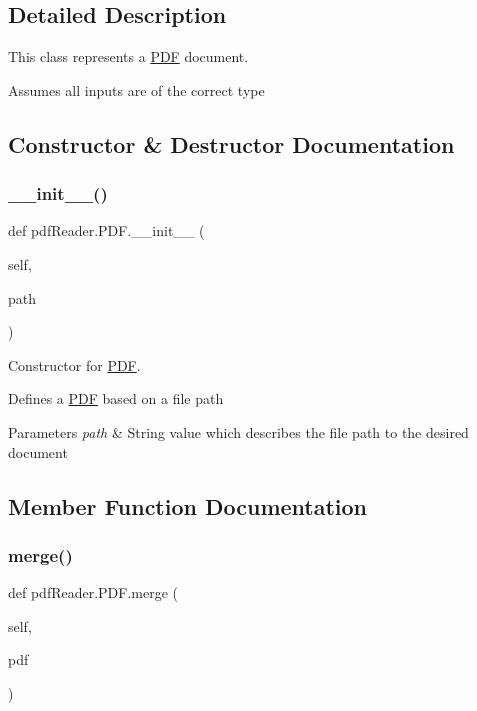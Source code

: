 \subsection{Detailed Description}
This class represents a \hyperlink{classpdfReader_1_1PDF}{P\+DF} document. 

Assumes all inputs are of the correct type 

\subsection{Constructor \& Destructor Documentation}
\mbox{\label{classpdfReader_1_1PDF_ad3a030d731fe9fdbdd25cbdf2811cfd9}} 
\subsubsection{\texorpdfstring{\+\_\+\+\_\+init\+\_\+\+\_\+()}{\_\_init\_\_()}}
{\footnotesize\ttfamily def pdf\+Reader.\+P\+D\+F.\+\_\+\+\_\+init\+\_\+\+\_\+ (\begin{DoxyParamCaption}\item[{}]{self,  }\item[{}]{path }\end{DoxyParamCaption})}



Constructor for \hyperlink{classpdfReader_1_1PDF}{P\+DF}. 

Defines a \hyperlink{classpdfReader_1_1PDF}{P\+DF} based on a file path 
\begin{DoxyParams}{Parameters}
{\em path} & String value which describes the file path to the desired document \\
\hline
\end{DoxyParams}


\subsection{Member Function Documentation}
\mbox{\label{classpdfReader_1_1PDF_a64f25f9ee8d33642377bcec567898a23}} 
\subsubsection{\texorpdfstring{merge()}{merge()}}
{\footnotesize\ttfamily def pdf\+Reader.\+P\+D\+F.\+merge (\begin{DoxyParamCaption}\item[{}]{self,  }\item[{}]{pdf }\end{DoxyParamCaption})}



